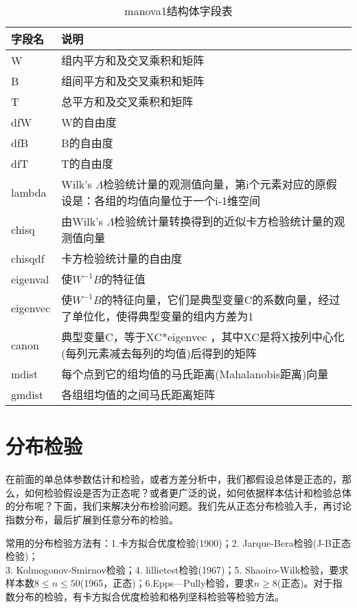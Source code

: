     \begin{table}[H]
    \caption{manova1结构体字段表}
    \label{tab:manova1结构体字段表}
    \centering
    \begin{tabularx}{\textwidth}{|l|X|}%
    \toprule
    字段名& 说明\\
    \midrule
    W  & 组内平方和及交叉乘积和矩阵 \\\hline
    B  & 组间平方和及交叉乘积和矩阵\\\hline
    T  &总平方和及交叉乘积和矩阵\\\hline
    dfW &W的自由度\\\hline
    dfB &B的自由度\\\hline
    dfT &T的自由度\\\hline
    lambda & Wilk's $\Lambda$检验统计量的观测值向量，第i个元素对应的原假设是：各组的均值向量位于一个i-1维空间\\\hline
    chisq &由Wilk's $\Lambda$检验统计量转换得到的近似卡方检验统计量的观测值向量\\\hline
    chisqdf &卡方检验统计量的自由度\\\hline
    eigenval  &使$W^{-1}B$的特征值\\\hline
    eigenvec  &使$W^{-1}B$的特征向量，它们是典型变量C的系数向量，经过了单位化，使得典型变量的组内方差为1\\\hline
    canon &典型变量C，等于XC*eigenvec ，其中XC是将X按列中心化(每列元素减去每列的均值)后得到的矩阵\\\hline
    mdist & 每个点到它的组均值的马氏距离(Mahalanobis距离)向量\\\hline
    gmdist & 各组组均值的之间马氏距离矩阵\\
        \bottomrule
    \end{tabularx}
    \end{table}
\section{分布检验}
    \par
    在前面的单总体参数估计和检验，或者方差分析中，我们都假设总体是正态的，那么，如何检验假设是否为正态呢？或者更广泛的说，如何依据样本估计和检验总体的分布呢？下面，我们来解决分布检验问题。我们先从正态分布检验入手，再讨论指数分布，最后扩展到任意分布的检验。
    \par
    常用的分布检验方法有：1.卡方拟合优度检验(1900)；2. Jarque-Bera检验(J-B正态检验)；\\3. Kolmogonov-Smirnov检验；4. lillietest检验(1967)；5. Shaoiro-Wilk检验，要求样本数$8 \leqslant n \leqslant 50$(1965，正态)；6.Epps—Pully检验，要求$n \geqslant 8$(正态)。对于指数分布的检验，有卡方拟合优度检验和格列坚科检验等检验方法。
